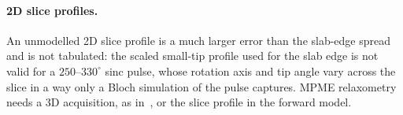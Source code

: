 \paragraph{2D slice profiles.} An unmodelled 2D slice profile is a much larger error than the
slab-edge spread and is not tabulated: the scaled small-tip profile used for the slab edge is not
valid for a $250$--$330^\circ$ sinc pulse, whose rotation axis and tip angle vary across the slice in a
way only a Bloch simulation of the pulse captures. MPME relaxometry needs a 3D acquisition, as
in~\cite{cheng2019}, or the slice profile in the forward model.
